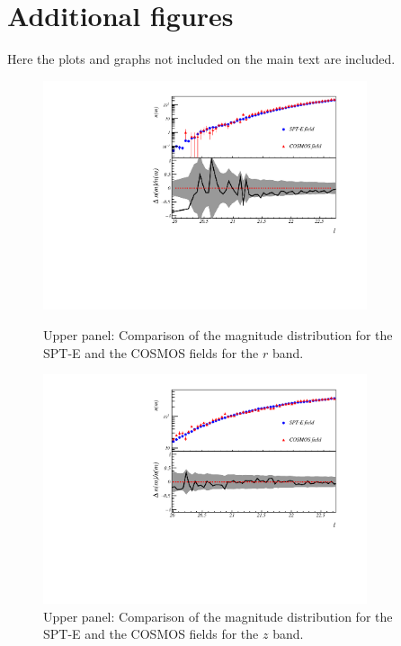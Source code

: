 \chapter{Additional figures}
\label{sec:figures}

Here the plots and graphs not included on the main text are  included.

\begin{figure}
\begin{center}
\includegraphics[width=0.85\textwidth]{./figures_appendix/SPTE_SNe_r.pdf}
\caption{Upper panel: Comparison of the magnitude distribution for the SPT-E and the COSMOS fields for the $r$ band.}
\includegraphics[width=0.85\textwidth]{./figures_appendix/SPTE_SNe_z.pdf}
\caption{Upper panel: Comparison of the magnitude distribution for the SPT-E and the COSMOS fields for the $z$ band.}
\end{center}
\end{figure}

